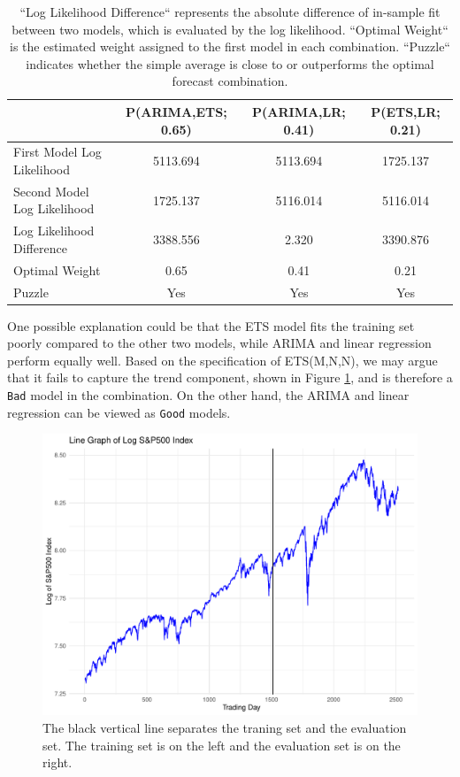 \documentclass{monashthesis}
\begin{document}
\begin{table}[ht]
  \centering
    \begin{tabular}{l|ccc}
    \toprule
                                      &    P(ARIMA,ETS; 0.65)     &   P(ARIMA,LR; 0.41)    &    P(ETS,LR; 0.21)   \\  
    \midrule
    First Model Log Likelihood        &     5113.694       &    5113.694    &   1725.137     \\
    Second Model Log Likelihood       &     1725.137       &    5116.014    &   5116.014     \\
    Log Likelihood Difference         &     3388.556       &     2.320      &   3390.876     \\
    Optimal Weight                    &       0.65         &      0.41      &     0.21       \\
    Puzzle                            &       Yes          &      Yes       &     Yes        \\
    \bottomrule
    \end{tabular}
  \caption{``Log Likelihood Difference`` represents the absolute difference of in-sample fit between two models, which is evaluated by the log likelihood. ``Optimal Weight`` is the estimated weight assigned to the first model in each combination. ``Puzzle`` indicates whether the simple average is close to or outperforms the optimal forecast combination.}
  \label{tab:nonfit}
\end{table}

One possible explanation could be that the ETS model fits the training set poorly compared to the other two models, while ARIMA and linear regression perform equally well. Based on the specification of ETS(M,N,N), we may argue that it fails to capture the trend component, shown in Figure \ref{fig:llg}, and is therefore a \texttt{Bad} model in the combination. On the other hand, the ARIMA and linear regression can be viewed as \texttt{Good} models.

\begin{figure}[ht]
\centering
\includegraphics[scale=0.4]{figures/log_linegraph.pdf}
\caption{The black vertical line separates the traning set and the evaluation set. The training set is on the left and the evaluation set is on the right.}
\label{fig:llg}
\end{figure}
\end{document}

